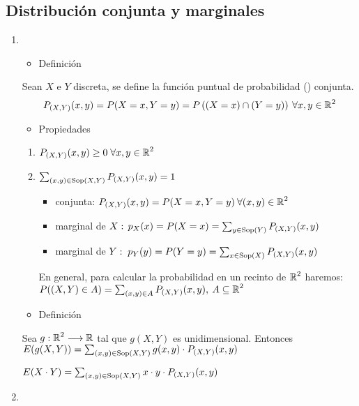 \subsection{Distribución conjunta y marginales}
\begin{enumerate}[label=\color{red}\textbf{\Alph*)}, leftmargin=*]
	\item {}
	\begin{itemize}[label=\color{red}\textbullet, leftmargin=*]
		\item \color{lightblue}Definición
	\end{itemize}
	Sean $X$ e $Y$ \vas discreta, se define la función puntual de probabilidad (\fpp) conjunta.\[ P_{(X,Y)}(x,y)=P(X=x,Y=y)=P\left((X=x)\cap(Y=y)\right)\:\forall x,y\in\operatorname{\mathbb{R}}^2 \]
	\begin{itemize}[label=\color{red}\textbullet, leftmargin=*]
		\item \color{lightblue}Propiedades
	\end{itemize}
	\begin{enumerate}[label=\color{lightblue}\arabic*)]
		\item $P_{(X,Y)}(x,y)\ge0\;\forall x,y\in\operatorname{\mathbb{R}}^2$
		\item $\sum_{(x,y)\in\operatorname{Sop}(X,Y)}P_{(X,Y)}(x,y)=1$
\begin{itemize}[leftmargin=*]
	\item \Fpp conjunta: $P_{(X,Y)}(x,y)=P(X=x,Y=y)\:\forall(x,y)\in\operatorname{\mathbb{R}}^2$
	\item \Fpp marginal de $X:\,p_X(x)=P(X=x)=\sum_{y\in\operatorname{Sop}(Y)}P_{(X,Y)}(x,y)$
	\item \Fpp marginal de $Y:\;p_Y(y)=P(Y=y)=\sum_{x\in\operatorname{Sop}(X)}P_{(X,Y)}(x,y)$
\end{itemize}
En general, para calcular la probabilidad en un recinto de $\operatorname{\mathbb{R}}^2$ haremos: $P((X,Y)\in A)=\sum_{(x,y)\in A}P_{(X,Y)}(x,y),\:A\subseteq\operatorname{\mathbb{R}}^2$
	\end{enumerate}
	\begin{itemize}[label=\color{red}\textbullet, leftmargin=*]
		\item \color{lightblue}Definición
	\end{itemize}
	Sea $g:\operatorname{\mathbb{R}}^2\longrightarrow\operatorname{\mathbb{R}}$ tal que $g(X,Y)$ es \va unidimensional. Entonces $E(g(X,Y))=\sum_{(x,y)\in\operatorname{Sop}(X,Y)}g(x,y)\cdot P_{(X,Y)}(x,y)$
	
	\Ej
	
	$E(X\cdot Y)=\sum_{(x,y)\in\operatorname{Sop}(X,Y)}x\cdot y\cdot P_{(X,Y)}(x,y)$
	\item {}
	

\end{enumerate}
